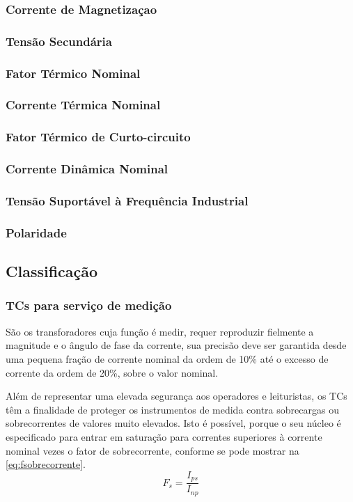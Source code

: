			\subsubsection{Corrente de Magnetizaçao}
			\subsubsection{Tensão Secundária}
			\subsubsection{Fator Térmico Nominal}
			\subsubsection{Corrente Térmica Nominal}
			\subsubsection{Fator Térmico de Curto-circuito}
			\subsubsection{Corrente Dinâmica Nominal}
			\subsubsection{Tensão Suportável à Frequência Industrial}
			\subsubsection{Polaridade}



		\subsection{Classificação}
			\subsubsection{TCs para serviço de medição}
				São os transforadores cuja função é medir, requer reproduzir fielmente a magnitude e o ângulo de fase da corrente, sua precisão deve ser garantida desde uma pequena fração de corrente nominal da ordem de 10\% até o excesso de corrente da ordem de 20\%, sobre o valor nominal.\cite{apuntesmeza}\par
				Além de representar uma elevada segurança aos operadores e leituristas, os TCs têm a finalidade de proteger os instrumentos de medida contra sobrecargas ou sobrecorrentes de valores muito elevados. Isto é possível, porque o seu núcleo é especificado para entrar em saturação para correntes superiores à corrente nominal vezes o fator de sobrecorrente, conforme se pode mostrar na \autoref{eq:fsobrecorrente}.
				\begin{equation} \label{eq:fsobrecorrente}
					F_{s} = \frac{I_{ps}}{I_{np}}
					\end{equation}

